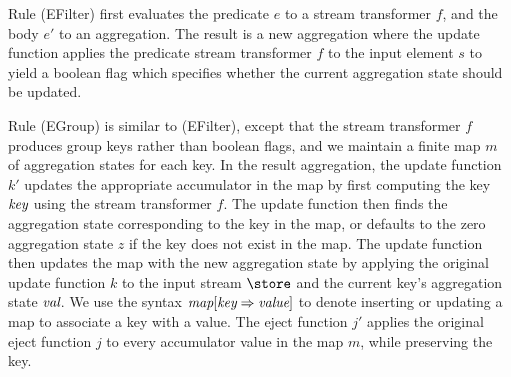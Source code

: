 
Rule (EFilter) first evaluates the predicate $e$ to a stream transformer $f$, and the body $e'$ to an aggregation. The result is a new aggregation where the update function applies the predicate stream transformer $f$ to the input element $s$ to yield a boolean flag which specifies whether the current aggregation state should be updated.

Rule (EGroup) is similar to (EFilter), except that the stream transformer $f$ produces group keys rather than boolean flags, and we maintain a finite map $m$ of aggregation states for each key.
In the result aggregation, the update function $k'$ updates the appropriate accumulator in the map by first computing the key $\textit{key}$ using the stream transformer $f$.
The update function then finds the aggregation state corresponding to the key in the map, or defaults to the zero aggregation state $z$ if the key does not exist in the map.
The update function then updates the map with the new aggregation state by applying the original update function $k$ to the input stream $\store$ and the current key's aggregation state $\textit{val}$.
We use the syntax $\textit{map}[\textit{key} \Rightarrow \textit{value}]$ to denote inserting or updating a map to associate a key with a value.
The eject function $j'$ applies the original eject function $j$ to every accumulator value in the map $m$, while preserving the key. 


